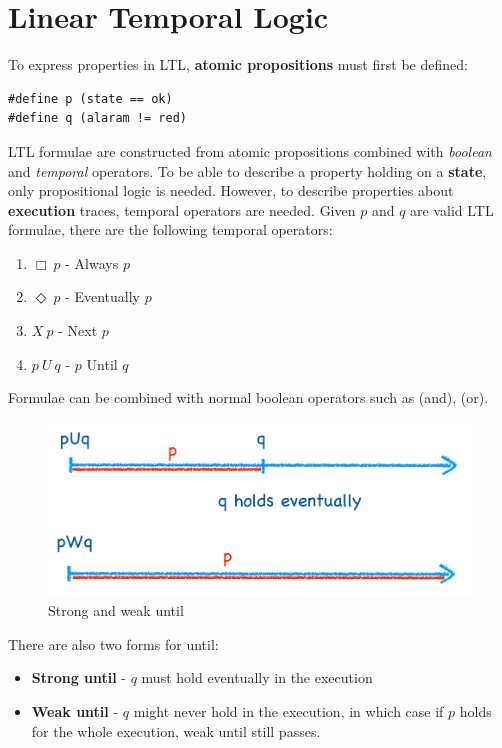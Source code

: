 \documentclass[11pt]{article}
\begin{document}
\section{Linear Temporal Logic}
To express properties in LTL, \textbf{atomic propositions} must first be defined:
\begin{lstlisting}[caption={Atomic propositions in PROMELA for LTL}, captionpos=b]
#define p (state == ok)
#define q (alaram != red)
\end{lstlisting}
\noindent
LTL formulae are constructed from atomic propositions combined with \textit{boolean} and \textit{temporal} operators. To be able to describe a property holding on a \textbf{state}, only propositional logic is needed. However, to describe properties about \textbf{execution} traces, temporal operators are needed.
\n
Given $p$ and $q$ are valid LTL formulae, there are the following temporal operators:
\begin{enumerate}
\item $\Box\ p$ - Always $p$
\item $\Diamond\ p$ - Eventually $p$
\item $X\ p$ - Next $p$
\item $p\ U\ q$ - $p$ Until $q$
\end{enumerate}
\noindent
Formulae can be combined with normal boolean operators such as \wedge (and), \vee (or).
\begin{figure}[H]
\centering
\includegraphics[width=1\textwidth, keepaspectratio]{imgs/strong-weak-until.png}
\caption{Strong and weak until}
\end{figure}
\noindent
There are also two forms for until:
\begin{itemize}
\item \textbf{Strong until} - $q$ must hold eventually in the execution
\item \textbf{Weak until} - $q$ might never hold in the execution, in which case if $p$ holds for the whole execution, weak until still passes.
\end{itemize}
\end{document}
